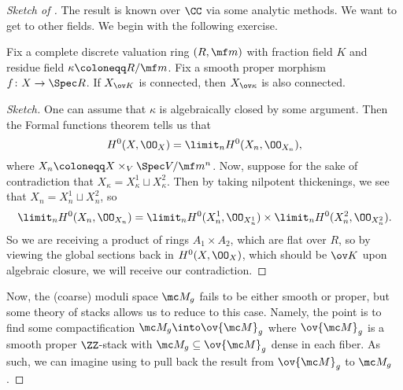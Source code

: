 \documentclass{article}
\begin{document}
\begin{proof}[Sketch of ]
	The result is known over $\CC$ via some analytic methods. We want to get to other fields. We begin with the following exercise.
	\begin{proposition} \label{prop:reduce-conn}
		Fix a complete discrete valuation ring $(R,\mf m)$ with fraction field $K$ and residue field $\kappa\coloneqq R/\mf m$. Fix a smooth proper morphism $f\colon X\to\Spec R$. If $X_{\ov K}$ is connected, then $X_{\ov\kappa}$ is also connected.
	\end{proposition}
	\begin{proof}[Sketch]
		One can assume that $\kappa$ is algebraically closed by some argument. Then the Formal functions theorem tells us that
		\[H^0(X,\OO_X)=\limit_nH^0(X_n,\OO_{X_n}),\]
		where $X_n\coloneqq X\times_V\Spec V/\mf m^n$. Now, suppose for the sake of contradiction that $X_\kappa=X^1_\kappa\sqcup X^2_\kappa$. Then by taking nilpotent thickenings, we see that $X_n=X^1_n\sqcup X^2_n$, so
		\[\limit_nH^0(X_n,\OO_{X_n})=\limit_nH^0(X_n^1,\OO_{X_n^1})\times\limit_nH^0(X_n^2,\OO_{X_n^2}).\]
		So we are receiving a product of rings $A_1\times A_2$, which are flat over $R$, so by viewing the global sections back in $H^0(X,\OO_X)$, which should be $\ov K$ upon algebraic closure, we will receive our contradiction.
	\end{proof}
	Now, the (coarse) moduli space $\mc M_g$ fails to be either smooth or proper, but some theory of stacks allows us to reduce to this case. Namely, the point is to find some compactification $\mc M_g\into\ov{\mc M}_g$ where $\ov{\mc M}_g$ is a smooth proper $\ZZ$-stack with $\mc M_g\subseteq\ov{\mc M}_g$ dense in each fiber. As such, we can imagine using  to pull back the result from $\ov{\mc M}_g$ to $\mc M_g$.
\end{proof}
\end{document}
